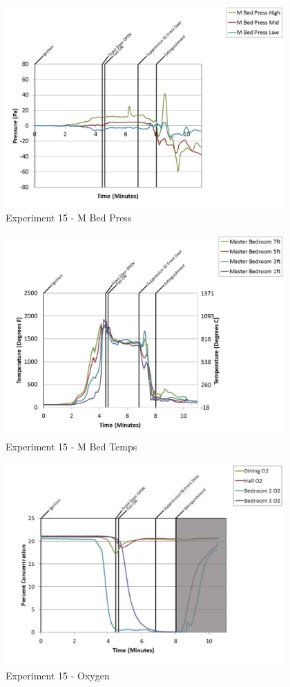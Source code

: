 \documentclass{article}
\begin{document}
\begin{appendices}
	\clearpage

	\begin{figure}[h!]
		\centering
		\includegraphics[height=3.05in]{0_Images/Results_Charts/Exp_15_Charts/MBedPress.pdf}
		\caption{Experiment 15 - M Bed Press}
	\end{figure}
 

	\begin{figure}[h!]
		\centering
		\includegraphics[height=3.05in]{0_Images/Results_Charts/Exp_15_Charts/MBedTemps.pdf}
		\caption{Experiment 15 - M Bed Temps}
	\end{figure}
 
	\clearpage

	\begin{figure}[h!]
		\centering
		\includegraphics[height=3.05in]{0_Images/Results_Charts/Exp_15_Charts/Oxygen.pdf}
		\caption{Experiment 15 - Oxygen}
	\end{figure}
 


\end{appendices}
\end{document}
